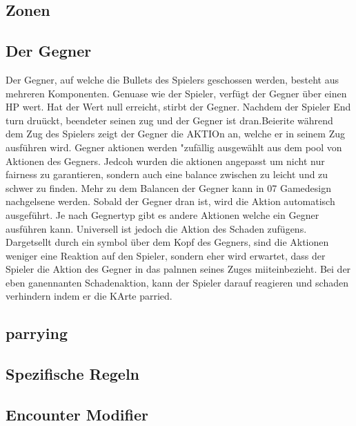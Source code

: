 

\subsection{Zonen}\label{backpack_and_deck}

\subsection{Der Gegner}\label{der_gegner}
Der Gegner, auf welche die Bullets des Spielers geschossen werden, besteht aus mehreren Komponenten.
Genuase wie der Spieler, verfügt der Gegner über einen HP wert. Hat der Wert null erreicht, stirbt der Gegner.
Nachdem der Spieler End turn druückt, beendeter seinen zug und der Gegner ist dran.Beierite während dem Zug des Spielers zeigt der Gegner die AKTIOn an, welche er in seinem Zug ausführen wird.
Gegner aktionen werden "zufällig ausgewählt aus dem pool von Aktionen des Gegners.
Jedcoh wurden die aktionen angepasst um nicht nur fairness zu garantieren,
sondern auch eine balance zwischen zu leicht und zu schwer zu finden.
Mehr zu dem Balancen der Gegner kann in 07 Gamedesign nachgelsene werden.
Sobald der Gegner dran ist, wird die Aktion automatisch ausgeführt. Je nach Gegnertyp gibt es andere Aktionen welche ein Gegner ausführen kann. Universell ist jedoch die Aktion des Schaden zufügens.
Dargetsellt durch ein symbol über dem Kopf des Gegners, sind die Aktionen weniger eine Reaktion auf den Spieler, sondern eher wird erwartet, dass der Spieler die Aktion des Gegner in das palnnen seines Zuges miiteinbezieht.
Bei der eben ganennanten Schadenaktion, kann der Spieler darauf reagieren und schaden verhindern indem er die KArte parried.

\subsection{parrying}\label{backpack_and_deck}

\subsection{Spezifische Regeln}\label{spezifische_regeln}
%

\subsection{Encounter Modifier}\label{backpack_and_deck}
%

\renewcommand{\kapitelautor}{}
